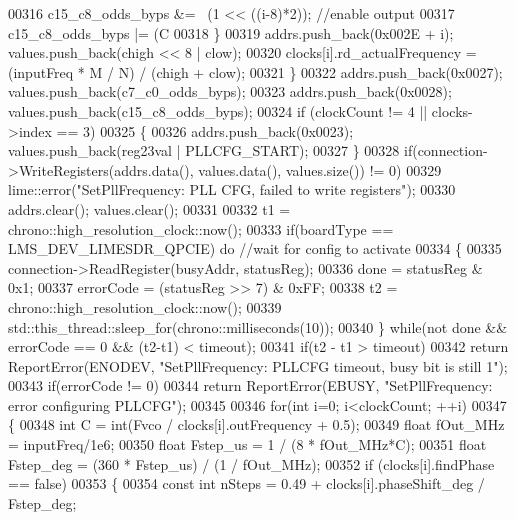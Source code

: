 \begin{DoxyCode}
{{{{{00316                 c15\_c8\_odds\_byps &= ~(1 << ((i-8)*2)); \textcolor{comment}{//enable output}
00317             c15\_c8\_odds\_byps |= (C %
00318         \}
00319         addrs.push\_back(0x002E + i); values.push\_back(chigh << 8 | clow);
00320         clocks[i].rd_actualFrequency = (inputFreq * M / N) / (chigh + clow);
00321     \}
00322     addrs.push\_back(0x0027); values.push\_back(c7\_c0\_odds\_byps);
00323     addrs.push\_back(0x0028); values.push\_back(c15\_c8\_odds\_byps);
00324     \textcolor{keywordflow}{if} (clockCount != 4 || clocks->index == 3)
00325     \{
00326         addrs.push\_back(0x0023); values.push\_back(reg23val | PLLCFG\_START);
00327     \}
00328     \textcolor{keywordflow}{if}(connection->WriteRegisters(addrs.data(), values.data(), values.size()) != 0)
00329         lime::error(\textcolor{stringliteral}{"SetPllFrequency: PLL CFG, failed to write registers"});
00330     addrs.clear(); values.clear();
00331 
00332     t1 = chrono::high\_resolution\_clock::now();
00333     \textcolor{keywordflow}{if}(boardType == LMS_DEV_LIMESDR_QPCIE) \textcolor{keywordflow}{do} \textcolor{comment}{//wait for config to activate}
00334     \{
00335         connection->ReadRegister(busyAddr, statusReg);
00336         done = statusReg & 0x1;
00337         errorCode = (statusReg >> 7) & 0xFF;
00338         t2 = chrono::high\_resolution\_clock::now();
00339         std::this\_thread::sleep\_for(chrono::milliseconds(10));
00340     \} \textcolor{keywordflow}{while}(not done && errorCode == 0 && (t2-t1) < timeout);
00341     \textcolor{keywordflow}{if}(t2 - t1 > timeout)
00342         \textcolor{keywordflow}{return} ReportError(ENODEV, \textcolor{stringliteral}{"SetPllFrequency: PLLCFG timeout, busy bit is still 1"});
00343     \textcolor{keywordflow}{if}(errorCode != 0)
00344         \textcolor{keywordflow}{return} ReportError(EBUSY, \textcolor{stringliteral}{"SetPllFrequency: error configuring PLLCFG"});
00345 
00346     \textcolor{keywordflow}{for}(\textcolor{keywordtype}{int} i=0; i<clockCount; ++i)
00347     \{
00348         \textcolor{keywordtype}{int} C = int(Fvco / clocks[i].outFrequency + 0.5);
00349         \textcolor{keywordtype}{float} fOut\_MHz = inputFreq/1e6;
00350         \textcolor{keywordtype}{float} Fstep\_us = 1 / (8 * fOut\_MHz*C);
00351         \textcolor{keywordtype}{float} Fstep\_deg = (360 * Fstep\_us) / (1 / fOut\_MHz);
00352         \textcolor{keywordflow}{if} (clocks[i].findPhase == \textcolor{keyword}{false})
00353         \{
00354            \textcolor{keyword}{const} \textcolor{keywordtype}{int} nSteps = 0.49 + clocks[i].phaseShift_deg  / Fstep\_deg;
}}}}}
\end{DoxyCode}
